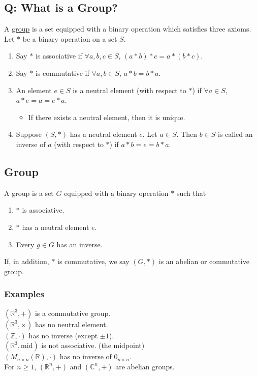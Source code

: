 \documentclass[11pt]{article}
\newcommand{\0}{\emptyset}
\newcommand{\Z}{\mathbb{Z}}
\newcommand{\R}{\mathbb{R}}
\newcommand{\C}{\mathbb{C}}
\begin{document}
\subsection*{Q: What is a Group?}
\label{sec:orgf6eec49}
A \href{../Definitions/group.org}{group} is a set equipped with a binary operation which satisfies three axioms.\\[0pt]
Let \(*\) be a binary operation on a set \(S\).\\[0pt]
\begin{enumerate}
\item Say \(*\) is associative if \(\forall a,b,c\in S\), \((a*b)*c=a*(b*c)\).\\[0pt]
\item Say \(*\) is commutative if \(\forall a,b\in S\), \(a*b=b*a\).\\[0pt]
\item An element \(e\in S\) is a neutral element (with respect to \(*\)) if \(\forall a\in S\), \(a*e=a=e*a\).\\[0pt]
\begin{itemize}
\item If there exists a neutral element, then it is unique.\\[0pt]
\end{itemize}
\item Suppose \((S,*)\) has a neutral element \(e\). Let \(a\in S\). Then \(b\in S\) is called an inverse of \(a\) (with respect to \(*\)) if \(a*b=e=b*a\).\\[0pt]
\end{enumerate}
\subsection*{Group}
\label{sec:org6c3b2f9}
A group is a set \(G\) equipped with a binary operation \(*\) such that\\[0pt]
\begin{enumerate}
\item \(*\) is associative.\\[0pt]
\item \(*\) has a neutral element \(e\).\\[0pt]
\item Every \(g\in G\) has an inverse.\\[0pt]
\end{enumerate}
If, in addition, \(*\) is commutative, we say \((G,*)\) is an abelian or commutative group.\\[0pt]
\subsubsection*{Examples}
\label{sec:org7530c0b}
\((\R^{3},+)\) is a commutative group.\\[0pt]
\((\R^{3},\times)\) has no neutral element.\\[0pt]
\((\Z,\cdot)\) has no inverse (except \(\pm 1\)).\\[0pt]
\((\R^{3},\text{mid})\) is not associative. (the midpoint)\\[0pt]
\((M_{n\times n}(\R),\cdot)\) has no inverse of \(0_{n\times n}\).\\[0pt]
For \(n\geq 1\), \((\R^{n},+)\) and \((\C^{n},+)\) are abelian groups.\\[0pt]
\end{document}
